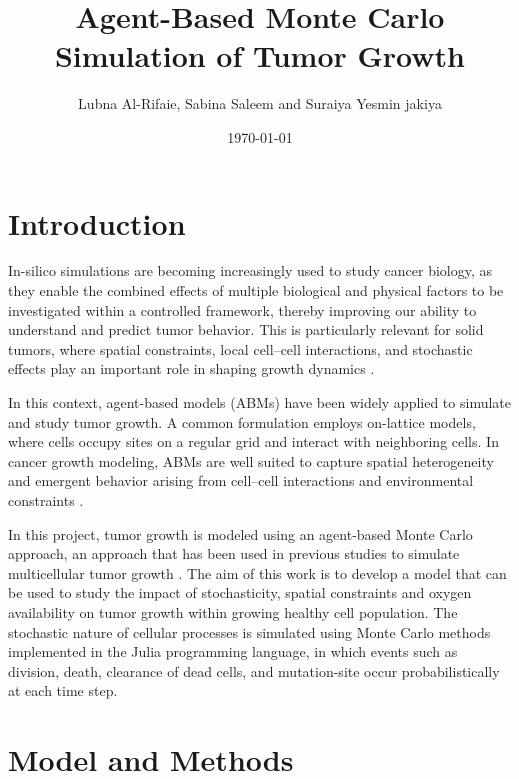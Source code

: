 \documentclass[11pt,a4paper,twoside]{article}
\begin{document}
\title{Agent-Based Monte Carlo Simulation of Tumor Growth}
\author{Lubna Al-Rifaie, Sabina Saleem and Suraiya Yesmin jakiya}
\date{\today}

\maketitle

\section{Introduction}

In-silico simulations are becoming increasingly used to study cancer biology, as they enable the combined effects of multiple biological
and physical factors to be investigated within a controlled framework, thereby improving our ability to understand and predict tumor behavior\cite{Wang2014}.
This is particularly relevant for solid tumors, where spatial constraints, local cell–cell interactions, and stochastic effects play an 
important role in shaping growth dynamics \cite{Chkhaidze2019}.

In this context, agent-based models (ABMs) have been widely applied to simulate and study tumor growth. A common formulation employs 
on-lattice models, where cells occupy sites on a regular grid and interact with neighboring cells. In cancer growth modeling, ABMs 
are well suited to capture spatial heterogeneity and emergent behavior arising from cell–cell interactions and environmental constraints \cite{Wang2014} \cite{Drasdo2005} \cite{Metzcar2019} .

In this project, tumor growth is modeled using an agent-based Monte Carlo approach, an approach that has been used in previous studies
to simulate multicellular tumor growth \cite{RuizArrebola2020}. The aim of this work is to develop a model that can be used to study the impact of
stochasticity, spatial constraints and oxygen availability on tumor growth within growing healthy cell population. The stochastic
nature of cellular processes is simulated using Monte Carlo methods implemented in the Julia programming language, in which events 
such as division, death, clearance of dead cells, and mutation-site occur probabilistically at each time step.


\section{Model and Methods}
\end{document}
